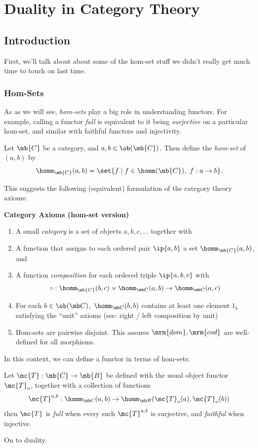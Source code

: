 \documentclass{fkbook}
\theoremstyle{snazzydefinition}
\begin{document}
\chapter{Duality in Category Theory}
\begin{adjustwidth}{1em}{1em}
  \section{Introduction}
  First, we'll talk about about some of the hom-set stuff we didn't
  really get much time to touch on last time.
  \subsection{Hom-Sets}
  As as we will see, \emph{hom-sets} play a big role in understanding
  functors. For example, calling a functor \emph{full} is equivalent
  to it being \emph{surjective} on a particular hom-set, and similar
  with faithful functors and injectivity.
  \begin{definition}
    Let $\mb{C}$ be a category, and $a,b \in \ob(\mb{C})$. Then define
    the \emph{hom-set} of $(a,b)$ by
    \[
      \homm_{\mb{C}}(a,b) = \set{f \mid f \in \homm(\mb{C}),\ f : a
        \to b}.
    \]
  \end{definition}
  This suggests the following (equivalent) formulation of the category
  theory axioms:
  \begin{leftbar}
    {\large \bfseries Category Axioms (hom-set version)}
    \begin{enumerate}[label=(\roman*)]
      \item A small \emph{category} is a set of objects $a,b,c,\ldots$
        together with
      \item A function that assigns to each ordered pair $\ip{a,b}$ a
        set $\homm_{\mb{C}}(a,b)$, and
      \item A function \emph{composition} for each ordered triple
        $\ip{a,b,c}$ with
        \[
          \circ : \homm_{\mb{C}}(b,c) \times \homm_{\mb C}(a,b) \to
          \homm_{\mb C}(a,c)
        \]
      \item For each $b \in \ob(\mb C)$, $\homm_{\mb C}(b,b)$ contains
        at least one element $1_b$ satisfying the ``unit'' axioms
        (see: right / left composition by unit)
      \item Hom-sets are pairwise disjoint. This assures $\mrm{dom},
        \mrm{cod}$ are well-defined for all morphisms.
    \end{enumerate}
  \end{leftbar}
  In this context, we can define a functor in terms of hom-sets:
  \begin{definition}
    Let $\mc{T} : \mb{C} \to \mb{B}$ be defined with the usual object
    functor $\mc{T}_o$, together with a collection of functions
    \[
      \mc{T}^{a,b} : \homm_{\mb C}(a,b) \to \homm_{\mb B}(\mc{T}_o(a),
      \mc{T}_o(b))
    \]
    then $\mc{T}$ is \emph{full} when every such $\mc{T}^{a,b}$ is
    surjective, and \emph{faithful} when injective.
  \end{definition}
  On to duality.

\end{adjustwidth}
\end{document}
